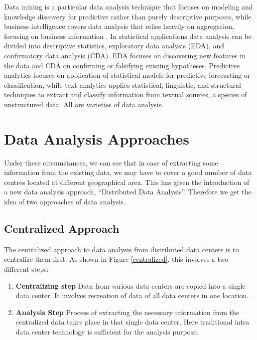 \documentclass[12pt,notitlepage,oneside]{report}
\begin{document}
Data mining is a particular data analysis technique that focuses on modeling and knowledge discovery for predictive rather than purely descriptive purposes, while business intelligence covers data analysis that relies heavily on aggregation, focusing on business information \cite{01}. In statistical applications data analysis can be divided into descriptive statistics, exploratory data analysis (EDA), and confirmatory data analysis (CDA). EDA focuses on discovering new features in the data and CDA on confirming or falsifying existing hypotheses. Predictive analytics focuses on application of statistical models for predictive forecasting or classification, while text analytics applies statistical, linguistic, and structural techniques to extract and classify information from textual sources, a species of unstructured data. All are varieties of data analysis.


\section{Data Analysis Approaches }
Under these circumstances, we can see that in case of extracting some information from the existing data, we may have to cover a good number of data centres located at different geographical area. This has given the introduction of a new data analysis approach, ``Distributed Data Analysis''. Therefore we get the idea of two approaches of data analysis.

\subsection{Centralized Approach}
The centralized approach to data analysis from distributed data centers is to centralize them first. As shown in Figure \ref{centralized}, this involves a two different steps: 


\begin{enumerate}

\item \textbf{Centralizing step} Data from various data centers are copied into a single data center. It involves recreation of data of all data centers in one location.

\item \textbf{Analysis Step} Process of extracting the necessary information from the centralized data takes place in that single data center. Here traditional intra data center technology is sufficient for the analysis purpose.

\end{enumerate}
\end{document}
